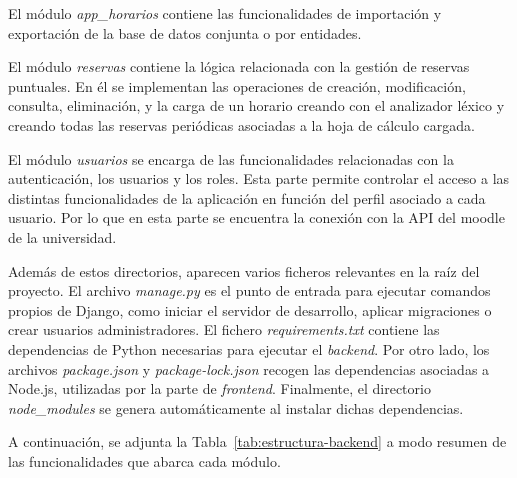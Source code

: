 El módulo \textit{app\_horarios} contiene las funcionalidades de importación y exportación de la base de datos conjunta o por entidades.

El módulo \textit{reservas} contiene la lógica relacionada con la gestión de reservas puntuales. En él se implementan las operaciones de creación, modificación, consulta, eliminación, y la carga de un horario creando con el analizador léxico y creando todas las reservas periódicas asociadas a la hoja de cálculo cargada.

El módulo \textit{usuarios} se encarga de las funcionalidades relacionadas con la autenticación, los usuarios y los roles. Esta parte permite controlar el acceso a las distintas funcionalidades de la aplicación en función del perfil asociado a cada usuario. Por lo que en esta parte se encuentra la conexión con la API del moodle de la universidad.

Además de estos directorios, aparecen varios ficheros relevantes en la raíz del proyecto. El archivo \textit{manage.py} es el punto de entrada para ejecutar comandos propios de Django, como iniciar el servidor de desarrollo, aplicar migraciones o crear usuarios administradores. El fichero \textit{requirements.txt} contiene las dependencias de Python necesarias para ejecutar el \textit{backend}. Por otro lado, los archivos \textit{package.json} y \textit{package-lock.json} recogen las dependencias asociadas a Node.js, utilizadas por la parte de \textit{frontend}. Finalmente, el directorio \textit{node\_modules} se genera automáticamente al instalar dichas dependencias.

A continuación, se adjunta la Tabla~\ref{tab:estructura-backend} a modo resumen de las funcionalidades que abarca cada módulo.

